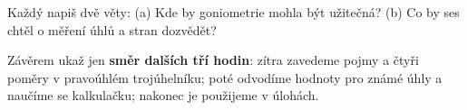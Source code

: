 \documentclass[11pt,a4paper]{article}
\begin{document}
\begin{zadaniBox}[title={Samostatná práce 4}]
Každý napiš dvě věty: (a) Kde by goniometrie mohla být užitečná?
(b) Co by ses chtěl o měření úhlů a stran dozvědět?
\end{zadaniBox}
Závěrem ukaž jen \textbf{směr dalších tří hodin}: zítra zavedeme pojmy
a čtyři poměry v pravoúhlém trojúhelníku; poté odvodíme hodnoty
pro známé úhly a naučíme se kalkulačku; nakonec je použijeme v úlohách.
\end{document}

